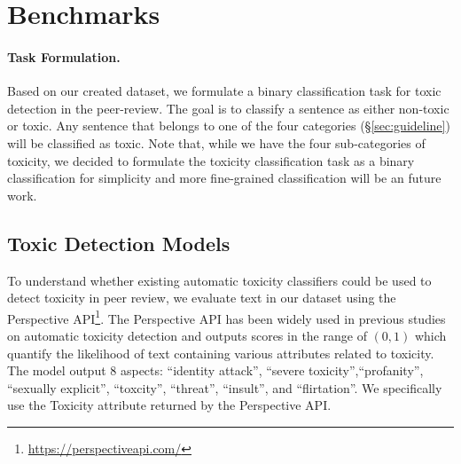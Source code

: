 \section{Benchmarks}
\label{sec:methods}

\paragraph{Task Formulation.}
Based on our created dataset, we formulate a binary classification task for toxic detection in the peer-review. The goal is to classify a sentence as either non-toxic or toxic. Any sentence that belongs to one of the four categories (\S\ref{sec:guideline}) will be classified as toxic. 
Note that, while we have the four sub-categories of toxicity, we decided to formulate the toxicity classification task as a binary classification for simplicity and more fine-grained classification will be an future work. 


\subsection{Toxic Detection Models} 


To understand whether existing automatic toxicity classifiers could be used to detect toxicity in peer review, we evaluate text in our dataset using the Perspective API\footnote{\url{https://perspectiveapi.com/}}. The Perspective API has been widely used in previous studies on automatic toxicity detection \cite{deshpande2023toxicity,faal2023reward,wen2023unveiling,howard2024uncovering} and outputs scores in the range of $(0,1)$ which quantify the likelihood of text containing various attributes related to toxicity. 
The model output 8 aspects: ``identity attack'', ``severe toxicity'',``profanity'', ``sexually explicit'',  ``toxcity'', ``threat'', ``insult'', and ``flirtation''.
We specifically use the Toxicity attribute returned by the Perspective API.

